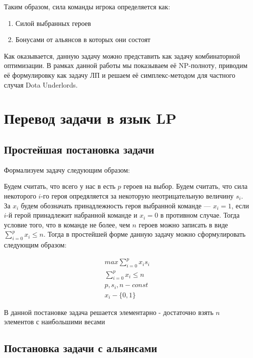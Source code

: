 \documentclass{article}
\begin{document}
Таким образом, сила команды игрока определяется как:

\begin{enumerate}
    \item Силой выбранных героев
    \item Бонусами от альянсов в которых они состоят
\end{enumerate}

Как оказывается, данную задачу можно представить как задачу комбинаторной оптимизации. В рамках данной работы мы показываем её NP-полноту, приводим её формулировку как задачу ЛП и решаем её симплекс-методом для частного случая Dota Underlords.

\section{Перевод задачи в язык LP}

\subsection{Простейшая постановка задачи}

Формализуем задачу следующим образом:

Будем считать, что всего у нас в есть $p$ героев на выбор. Будем считать, что сила некоторого $i$-го героя опредяляется за некоторую неотрицательную величину $s_i$. За $x_i$ будем обозначать принадлежность героя выбранной команде --- $x_i = 1$, если $i$-й герой принадлежит набранной команде и $x_i=0$ в противном случае. Тогда условие того, что в команде не более, чем $n$ героев можно записать в виде $\sum_{i=0}^p x_i \leq n$. Тогда в простейшей форме данную задачу можно сформулировать следующим образом:

\begin{equation}
\begin{gathered}
    max \sum_{i=0}^p x_i s_i \\
    \sum_{i=0}^p x_i \leq n \\
    p, s_i, n - const \\
    x_i - \{0, 1\}
\end{gathered}
\end{equation}

В данной постановке задача решается элементарно - достаточно взять $n$ элементов с наибольшими весами

\subsection{Постановка задачи с альянсами}
\end{document}
